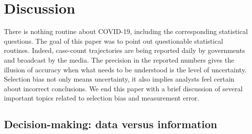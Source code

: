 \documentclass[aoas]{amsart}
\begin{document}

\section{Discussion}
\label{section:discussion}

There is nothing routine about COVID-19, including the corresponding statistical questions.  The goal of this paper was to point out questionable statistical routines.  Indeed, case-count trajectories are being reported daily by governments and broadcast by the media.  The precision in the reported numbers gives the illusion of accuracy when what needs to be understood is the level of uncertainty. Selection bias not only means uncertainty, it also implies analysts feel certain about incorrect conclusions.  We end this paper with a brief discussion of several important topics related to selection bias and measurement error.

\subsection*{Decision-making: data versus information}
\end{document}
